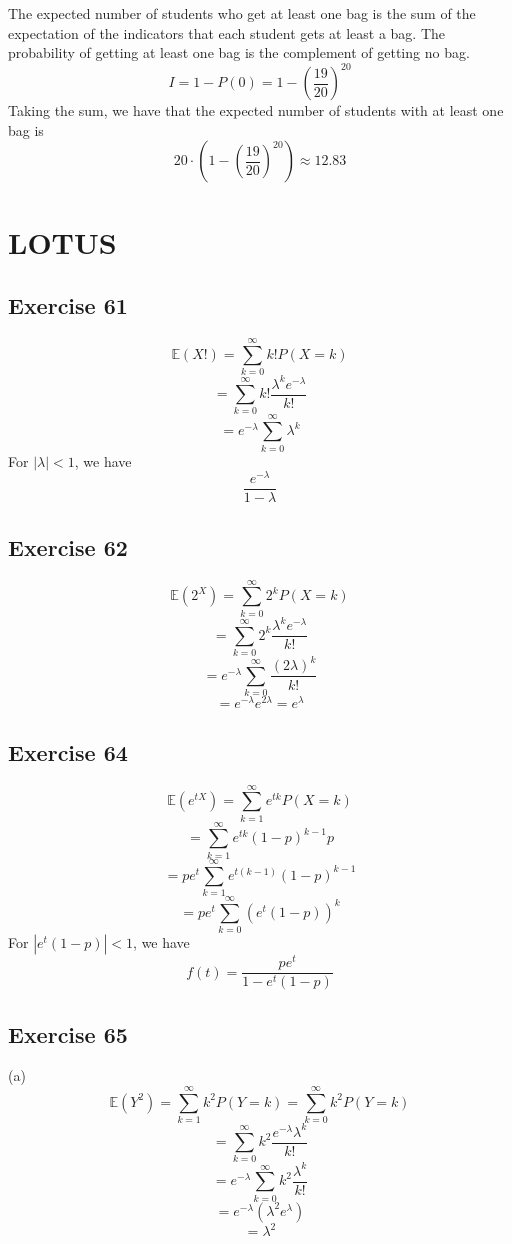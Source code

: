 \documentclass{book}
\begin{document}
The expected number of students who get at least one bag is the sum of the expectation of the indicators that each student gets at least a bag. The probability of getting at least one bag is the complement of getting no bag.
$$I = 1 - P(0) = 1 - \left( \frac{19}{20} \right)^{20}$$
Taking the sum, we have that the expected number of students with at least one bag is
$$20 \cdot \left(1 - \left( \frac{19}{20} \right)^{20}\right) \approx 12.83$$

\section{LOTUS}

\subsection*{Exercise 61}
$$\mathbb{E}(X!) = \sum_{k = 0}^\infty k! P(X = k)$$
$$= \sum_{k = 0}^\infty k! \frac{\lambda^k e^{-\lambda}}{k!}$$
$$= e^{-\lambda} \sum_{k = 0}^\infty \lambda^k$$
For $|\lambda| < 1$, we have
$$\frac{e^{-\lambda}}{1 - \lambda}$$

\subsection*{Exercise 62}
$$\mathbb{E}(2^X) = \sum_{k = 0}^\infty 2^k P(X = k)$$
$$= \sum_{k = 0}^\infty 2^k \frac{\lambda^k e^{-\lambda}}{k!}$$
$$= e^{-\lambda} \sum_{k = 0}^\infty \frac{(2 \lambda)^k}{k!}$$
$$= e^{-\lambda} e^{2 \lambda} = e^{\lambda}$$

\subsection*{Exercise 64}
$$\mathbb{E}(e^{tX}) = \sum_{k = 1}^\infty e^{tk} P(X = k)$$
$$= \sum_{k = 1}^\infty e^{tk} (1 - p)^{k - 1} p$$
$$= pe^t \sum_{k = 1}^\infty e^{t(k - 1)} (1 - p)^{k - 1}$$
$$= pe^t \sum_{k = 0}^\infty (e^t(1 - p))^k$$
For $|e^t(1 - p)| < 1$, we have
$$f(t) = \frac{pe^t}{1 - e^t(1 - p)}$$

\subsection*{Exercise 65}
(a)
$$\mathbb{E}(Y^2) = \sum_{k = 1}^\infty k^2 P(Y = k) = \sum_{k = 0}^\infty k^2 P(Y = k)$$
$$= \sum_{k = 0}^\infty k^2 \frac{e^{-\lambda} \lambda^k}{k!}$$
$$= e^{-\lambda} \sum_{k = 0}^\infty k^2 \frac{\lambda^k}{k!}$$
$$= e^{-\lambda} (\lambda^2 e^\lambda)$$
$$= \lambda^2$$
\end{document}
